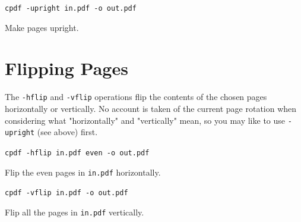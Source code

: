 \documentclass{book}
\begin{document}
  \begin{framed}
  \noindent\small\verb!cpdf -upright in.pdf -o out.pdf!

  \vspace{2.5mm}

  \noindent Make pages upright.
  \end{framed}

  \section{Flipping Pages}
  The \texttt{-hflip} and \texttt{-vflip} operations flip the contents of the
chosen pages horizontally or vertically. No account is taken of the current
page rotation when considering what "horizontally" and "vertically" mean, so you may like to use \texttt{-upright} (see above) first.
  \begin{framed}
    \noindent\small\verb!cpdf -hflip in.pdf even -o out.pdf!

    \vspace{2.5mm}
    \noindent Flip the even pages in \texttt{in.pdf} horizontally.

    \vspace{2.5mm}
    \noindent\verb!cpdf -vflip in.pdf -o out.pdf!

    \vspace{2.5mm}
    \noindent Flip all the pages in \texttt{in.pdf} vertically.
  \end{framed}
\end{document}
